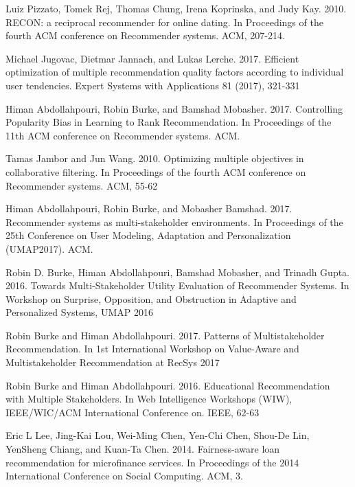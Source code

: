 \documentclass[sigconf]{acmart}
\begin{document}
\balance
\begin{thebibliography}{99}
 
 Luiz Pizzato, Tomek Rej, Thomas Chung, Irena Koprinska, and Judy Kay. 2010. RECON: a reciprocal recommender for online dating. In Proceedings of the fourth
ACM conference on Recommender systems. ACM, 207-214.
 
 Michael Jugovac, Dietmar Jannach, and Lukas Lerche. 2017. Efficient optimization of multiple recommendation quality factors according to individual user tendencies. Expert Systems with Applications 81 (2017), 321-331
 
 Himan Abdollahpouri, Robin Burke, and Bamshad Mobasher. 2017. Controlling
Popularity Bias in Learning to Rank Recommendation. In Proceedings of the 11th
ACM conference on Recommender systems. ACM.
  
 Tamas Jambor and Jun Wang. 2010. Optimizing multiple objectives in collaborative
filtering. In Proceedings of the fourth ACM conference on Recommender
systems. ACM, 55-62

 Himan Abdollahpouri, Robin Burke, and Mobasher Bamshad. 2017. Recommender systems as multi-stakeholder environments. In Proceedings of the 25th
Conference on User Modeling, Adaptation and Personalization (UMAP2017). ACM.

 Robin D. Burke, Himan Abdollahpouri, Bamshad Mobasher, and Trinadh Gupta. 2016. Towards Multi-Stakeholder Utility Evaluation of Recommender Systems.
In Workshop on Surprise, Opposition, and Obstruction in Adaptive and Personalized
Systems, UMAP 2016

 Robin Burke and Himan Abdollahpouri. 2017. Patterns of Multistakeholder Recommendation.
In 1st International Workshop on Value-Aware and Multistakeholder
Recommendation at RecSys 2017

 Robin Burke and Himan Abdollahpouri. 2016. Educational Recommendation with Multiple Stakeholders. In Web Intelligence Workshops (WIW), IEEE/WIC/ACM
International Conference on. IEEE, 62-63

 Eric L Lee, Jing-Kai Lou, Wei-Ming Chen, Yen-Chi Chen, Shou-De Lin, YenSheng Chiang, and Kuan-Ta Chen. 2014. Fairness-aware loan recommendation
for microfinance services. In Proceedings of the 2014 International Conference on
Social Computing. ACM, 3.

\end{thebibliography}  
\end{document}
